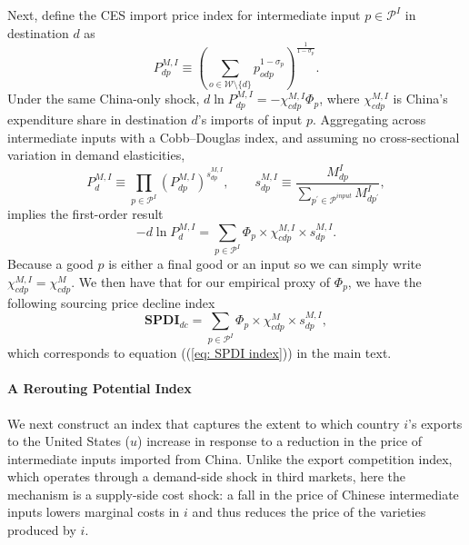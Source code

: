 \documentclass[english,12pt]{article}
\theoremstyle{definition}
\let\oldref\ref
\renewcommand{\ref}[1]{(\oldref{#1})}
\begin{document}
Next, define the CES import price index for intermediate input $p\in 
\mathcal{P}^{I}$ in destination $d$ as 
\begin{equation*}
P_{dp}^{M,I}\equiv \left( \sum_{o\in \mathcal{W}\setminus
\{d\}}p_{odp}^{1-\sigma _{p}}\right) ^{\frac{1}{1-\sigma _{p}}}.
\end{equation*}%
Under the same China-only shock, $d\ln P_{dp}^{M,I}=-\chi _{cdp}^{M,I}\Phi
_{p}$, where $\chi _{cdp}^{M,I}$ is China's expenditure share in destination 
$d$'s imports of input $p$. Aggregating across intermediate inputs with a
Cobb--Douglas index, and assuming no cross-sectional variation in demand
elasticities,  
\begin{equation*}
P_{d}^{M,I}\equiv \prod_{p\in \mathcal{P}^{I}}\left( P_{dp}^{M,I}\right)
^{s_{dp}^{M,I}},\qquad s_{dp}^{M,I}\equiv \frac{M_{dp}^{I}}{\sum_{p^{\prime
}\in \mathcal{P}^{input}}M_{dp^{\prime }}^{I}},
\end{equation*}%
implies the first-order result 
\begin{equation*}
-d\ln P_{d}^{M,I}=\sum_{p\in \mathcal{P}^{I}}\Phi _{p}\times \chi
_{cdp}^{M,I}\times s_{dp}^{M,I}.
\end{equation*}%
Because a good $p$ is either a final good or an input so we can simply write 
$\chi _{cdp}^{M,I}=\chi _{cdp}^{M}$. We then have that for our empirical
proxy of $\Phi _{p}$, we have the following sourcing price decline index 
\begin{equation*}
\boldsymbol{SPDI}_{dc}=\sum_{p\in \mathcal{P}^{I}}\Phi _{p}\times \chi
_{cdp}^{M}\times s_{dp}^{M,I},
\end{equation*}%
which corresponds to equation (\ref{eq: SPDI index}) in the main text.

\paragraph{A Rerouting Potential Index}

We next construct an index that captures the extent to which country $i$'s
exports to the United States ($u$) increase in response to a reduction in
the price of intermediate inputs imported from China. Unlike the export
competition index, which operates through a demand-side shock in third
markets, here the mechanism is a supply-side cost shock: a fall in the price
of Chinese intermediate inputs lowers marginal costs in $i$ and thus reduces
the price of the varieties produced by $i$.
\end{document}
